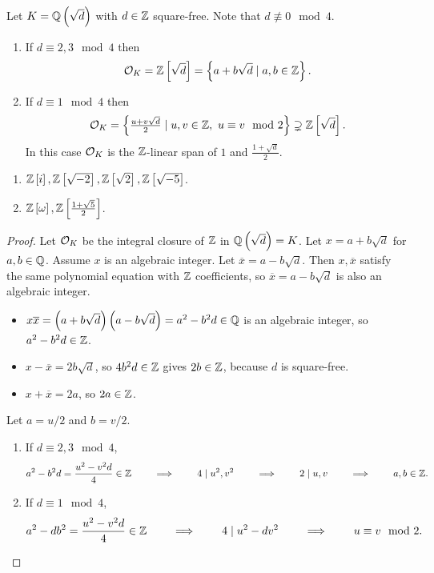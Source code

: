 \begin{theorem}
Let $ K = \mathbb{Q}\left( \sqrt{d} \right) $ with $ d \in \mathbb{Z} $ square-free. Note that $ d \not\equiv 0 \mod 4 $.
\begin{enumerate}
\item If $ d \equiv 2, 3 \mod 4 $ then
$$ \mathcal{O}_K = \mathbb{Z}\left[ \sqrt{d} \right] = \left\{ a + b\sqrt{d} \mid a, b \in \mathbb{Z} \right\}. $$
\item If $ d \equiv 1 \mod 4 $ then
$$ \mathcal{O}_K = \left\{ \tfrac{u + v\sqrt{d}}{2} \mid u, v \in \mathbb{Z}, \ u \equiv v \mod 2 \right\} \supsetneq \mathbb{Z}\left[ \sqrt{d} \right]. $$
In this case $ \mathcal{O}_K $ is the $ \mathbb{Z} $-linear span of $ 1 $ and $ \tfrac{1 + \sqrt{d}}{2} $.
\end{enumerate}
\end{theorem}

\begin{example*}
\hfill
\begin{enumerate}
\item $ \mathbb{Z}\left[ i \right], \mathbb{Z}\left[ \sqrt{-2} \right], \mathbb{Z}\left[ \sqrt{2} \right], \mathbb{Z}\left[ \sqrt{-5} \right] $.
\item $ \mathbb{Z}\left[ \omega \right], \mathbb{Z}\left[ \tfrac{1 + \sqrt{5}}{2} \right] $.
\end{enumerate}
\end{example*}

\begin{proof}
Let $ \mathcal{O}_K $ be the integral closure of $ \mathbb{Z} $ in $ \mathbb{Q}\left( \sqrt{d} \right) = K $. Let $ x = a + b\sqrt{d} $ for $ a, b \in \mathbb{Q} $. Assume $ x $ is an algebraic integer. Let $ \overline{x} = a - b\sqrt{d} $. Then $ x, \overline{x} $ satisfy the same polynomial equation with $ \mathbb{Z} $ coefficients, so $ \overline{x} = a - b\sqrt{d} $ is also an algebraic integer.
\begin{itemize}
\item $ x\overline{x} = \left( a + b\sqrt{d} \right)\left( a - b\sqrt{d} \right) = a^2 - b^2d \in \mathbb{Q} $ is an algebraic integer, so $ a^2 - b^2d \in \mathbb{Z} $.
\item $ x - \overline{x} = 2b\sqrt{d} $, so $ 4b^2d \in \mathbb{Z} $ gives $ 2b \in \mathbb{Z} $, because $ d $ is square-free.
\item $ x + \overline{x} = 2a $, so $ 2a \in \mathbb{Z} $.
\end{itemize}
Let $ a = u / 2 $ and $ b = v / 2 $.
\begin{enumerate}
\item If $ d \equiv 2, 3 \mod 4 $,
$$ a^2 - b^2d = \dfrac{u^2 - v^2d}{4} \in \mathbb{Z} \qquad \implies \qquad 4 \mid u^2, v^2 \qquad \implies \qquad 2 \mid u, v \qquad \implies \qquad a, b \in \mathbb{Z}. $$
\item If $ d \equiv 1 \mod 4 $,
$$ a^2 - db^2 = \dfrac{u^2 - v^2d}{4} \in \mathbb{Z} \qquad \implies \qquad 4 \mid u^2 - dv^2 \qquad \implies \qquad u \equiv v \mod 2. $$
\end{enumerate}
\end{proof}

